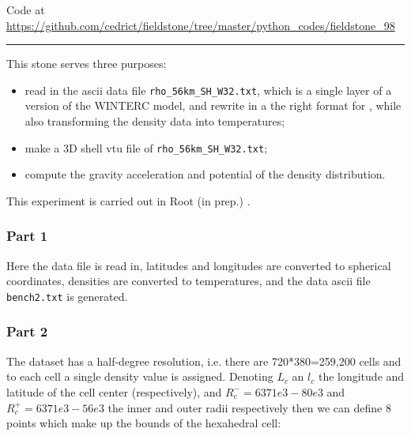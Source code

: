 

\begin{center}
Code at \url{https://github.com/cedrict/fieldstone/tree/master/python_codes/fieldstone_98}
\end{center}

\par\noindent\rule{\textwidth}{0.4pt}


This stone serves three purposes:
\begin{itemize}
\item read in the ascii data file {\tt rho\_56km\_SH\_W32.txt}, which is a 
single layer of a version of the WINTERC model, and rewrite in a the right format 
for \aspect{}, while also transforming the density data into temperatures;
\item make a 3D shell vtu file of {\tt rho\_56km\_SH\_W32.txt};
\item compute the gravity acceleration and potential of the density distribution. 
\end{itemize}
This experiment is carried out in Root \etal (in prep.) \cite{ross21}.

\subsubsection*{Part 1}

Here the data file is read in, latitudes and longitudes are 
converted to spherical coordinates, densities
are converted to temperatures, and the \aspect{} data ascii
file {\tt bench2.txt} is generated.


\subsubsection*{Part 2}

The dataset has a half-degree resolution, i.e.
there are 720*380=259,200 cells and to each cell a single density
value is assigned. Denoting $L_c$ an $l_c$ the longitude and latitude
of the cell center (respectively), and $R^-_c=6371e3-80e3$ and 
$R^+_c=6371e3-56e3$ the inner and outer radii respectively then we can 
define 8 points which make up the bounds of the hexahedral cell:

